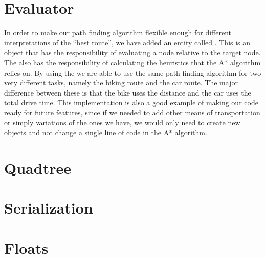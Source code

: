\section{Evaluator}
\label{IMPL-EVA}
In order to make our path finding algorithm flexible enough for different 
interpretations of the ``best route'', we have added an entity called . 
This is an object that has the responsibility of evaluating a node relative to 
the target node. The  also has the responsibility of calculating the 
heuristics that the A* algorithm relies on. By using the  we are able to 
use the same path finding algorithm for two very different tasks, namely the 
biking route and the car route. The major difference between these is that the 
bike uses the distance and the car uses the total drive time. This implementation 
is also a good example of making our code ready for future features, since if we 
needed to add other means of transportation or simply variations of the ones we 
have, we would only need to create new  objects and not change a single 
line of code in the A* algorithm.

\section{Quadtree}
\label{IMPL-QT}

\section{Serialization}
\label{IMPL-SERI}

\section{Floats}
\label{IMPL-F}